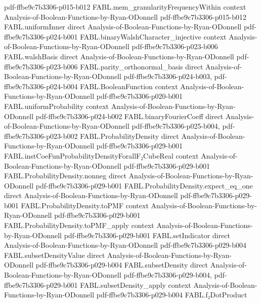 \begin{theorem}
  {pdf-ffbe9c7b3306-p015-b012}
\proofstep
  {FABL.mem_granularityFrequencyWithin}
  {context}
  {Analysis-of-Boolean-Functions-by-Ryan-ODonnell}
  {pdf-ffbe9c7b3306-p015-b012}
\proofstep
  {FABL.uniformInner}
  {direct}
  {Analysis-of-Boolean-Functions-by-Ryan-ODonnell}
  {pdf-ffbe9c7b3306-p024-b001}
\proofstep
  {FABL.binaryWalshCharacter_injective}
  {context}
  {Analysis-of-Boolean-Functions-by-Ryan-ODonnell}
  {pdf-ffbe9c7b3306-p023-b006}
\proofstep
  {FABL.walshBasis}
  {direct}
  {Analysis-of-Boolean-Functions-by-Ryan-ODonnell}
  {pdf-ffbe9c7b3306-p023-b006}
\proofstep
  {FABL.parity_orthonormal_basis}
  {direct}
  {Analysis-of-Boolean-Functions-by-Ryan-ODonnell}
  {pdf-ffbe9c7b3306-p024-b003,
    pdf-ffbe9c7b3306-p024-b004}
\proofstep
  {FABL.BooleanFunction}
  {context}
  {Analysis-of-Boolean-Functions-by-Ryan-ODonnell}
  {pdf-ffbe9c7b3306-p020-b001}
\proofstep
  {FABL.uniformProbability}
  {context}
  {Analysis-of-Boolean-Functions-by-Ryan-ODonnell}
  {pdf-ffbe9c7b3306-p024-b002}
\proofstep
  {FABL.binaryFourierCoeff}
  {direct}
  {Analysis-of-Boolean-Functions-by-Ryan-ODonnell}
  {pdf-ffbe9c7b3306-p025-b004,
    pdf-ffbe9c7b3306-p023-b002}
\proofstep
  {FABL.ProbabilityDensity}
  {direct}
  {Analysis-of-Boolean-Functions-by-Ryan-ODonnell}
  {pdf-ffbe9c7b3306-p029-b001}
\proofstep
  {FABL.instCoeFunProbabilityDensityForallF₂CubeReal}
  {context}
  {Analysis-of-Boolean-Functions-by-Ryan-ODonnell}
  {pdf-ffbe9c7b3306-p029-b001}
\proofstep
  {FABL.ProbabilityDensity.nonneg}
  {direct}
  {Analysis-of-Boolean-Functions-by-Ryan-ODonnell}
  {pdf-ffbe9c7b3306-p029-b001}
\proofstep
  {FABL.ProbabilityDensity.expect_eq_one}
  {direct}
  {Analysis-of-Boolean-Functions-by-Ryan-ODonnell}
  {pdf-ffbe9c7b3306-p029-b001}
\proofstep
  {FABL.ProbabilityDensity.toPMF}
  {context}
  {Analysis-of-Boolean-Functions-by-Ryan-ODonnell}
  {pdf-ffbe9c7b3306-p029-b001}
\proofstep
  {FABL.ProbabilityDensity.toPMF_apply}
  {context}
  {Analysis-of-Boolean-Functions-by-Ryan-ODonnell}
  {pdf-ffbe9c7b3306-p029-b001}
\proofstep
  {FABL.setIndicator}
  {direct}
  {Analysis-of-Boolean-Functions-by-Ryan-ODonnell}
  {pdf-ffbe9c7b3306-p029-b004}
\proofstep
  {FABL.subsetDensityValue}
  {direct}
  {Analysis-of-Boolean-Functions-by-Ryan-ODonnell}
  {pdf-ffbe9c7b3306-p029-b004}
\proofstep
  {FABL.subsetDensity}
  {direct}
  {Analysis-of-Boolean-Functions-by-Ryan-ODonnell}
  {pdf-ffbe9c7b3306-p029-b004,
    pdf-ffbe9c7b3306-p029-b001}
\proofstep
  {FABL.subsetDensity_apply}
  {context}
  {Analysis-of-Boolean-Functions-by-Ryan-ODonnell}
  {pdf-ffbe9c7b3306-p029-b004}
\proofstep
  {FABL.f₂DotProduct}

\end{theorem}
